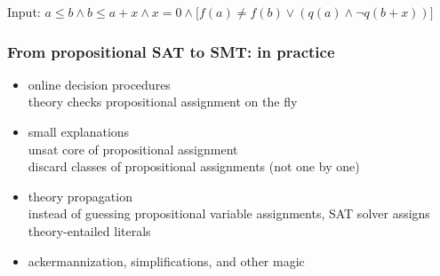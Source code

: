 \documentclass[svgnames,table,mathserif]{beamer}
\begin{document}
\begin{frame}
\vspace*{-14pt}
\begin{footnotesize}
  Input: $a \leq b \wedge b \leq a + x \wedge x = 0 \wedge
  \big[ f(a) \neq f(b) \vee (q(a) \wedge \neg q(b + x)) \big]$

  \vspace*{2pt}

  \vspace*{2pt}

  \vspace*{2pt}

  \vspace*{2pt}

\end{footnotesize}

\end{frame}


\begin{frame}
  \frametitle{From propositional SAT to SMT: in practice}

  \begin{itemize}
  \item online decision procedures\\
    {\small theory checks propositional assignment on the fly}
  \item small explanations\\
    {\small unsat core of propositional assignment\\
    discard classes of propositional assignments (not one by one)}
  \item theory propagation\\
    {\small instead of guessing propositional variable
    assignments, SAT solver assigns theory-entailed literals}
  \item ackermannization, simplifications, and other magic
  \end{itemize}

\end{frame}
\end{document}
